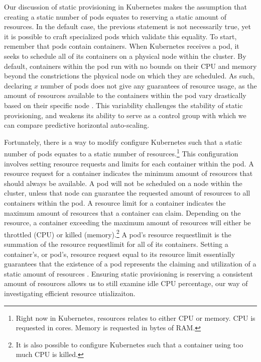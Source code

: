 Our discussion of static provisioning in Kubernetes makes the assumption that
creating a static number of pods equates to reserving a static amount of
resources. In the default case, the previous statement is not necessarily true,
yet it is possible to craft specialized pods which validate this equality. To
start, remember that pods contain containers. When Kubernetes receives a pod, it
seeks to schedule all of its containers on a physical node within the cluster.
By default, containers within the pod run with no bounds on their CPU and memory
beyond the constrictions the physical node on which they are scheduled. As such,
declaring $x$ number of pods does not give any guarantees of resource usage, as
the amount of resources available to the containers within the pod vary
drastically based on their specific node \cite{k8s-limit-range}. This variability challenges the
stability of static provisioning, and weakens its ability to serve as a control
group with which we can compare predictive horizontal auto-scaling.

Fortunately, there is a way to modify configure Kubernetes such that a static number of
pods equates to a static number of resources.\footnote{Right now in Kubernetes,
resources relates to either CPU or memory. CPU is requested in cores. Memory is
requested in bytes of RAM.} This configuration involves
setting resource requests and limits for each container within the pod. A
resource request for a container indicates the minimum amount of resources that
should always be available. A pod will not be scheduled on a node within the
cluster, unless that node can guarantee the requested amount of resources to all
containers within the pod. A resource limit for a container indicates the
maximum amount of resources that a container can claim. Depending on the
resource, a container exceeding the maximum amount of resources will either be
throttled (CPU) or killed (memory).\footnote{It is also possible to configure
Kubernetes such that a container using too much CPU is killed.} A pod's resource
request\/limit is the summation of the resource request\/limit for all of its
containers. Setting a container's, or pod's, resource request equal to its
resource limit essentially guarantees that the existence of a pod represents the
claiming and utilization of a static amount of resources
\cite{k8s-compute-resources}. Ensuring static provisioning
is reserving a consistent amount of resources
allows us to still examine idle CPU percentage, our way of investigating
efficient resource utializaiton.
